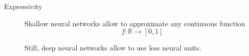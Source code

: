 \begin{description}
    \item[Expressivity] 
        Shallow neural networks allow to approximate any continuous function 
        \[ f: \mathbb{R} \rightarrow [0, 1] \]

        \begin{remark}
            Still, deep neural networks allow to use less neural units.
        \end{remark}
\end{description}